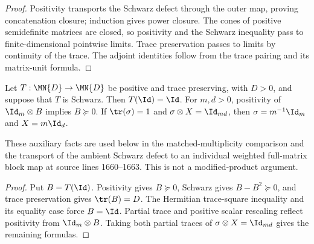 \begin{proof}
    \leanok
    Positivity transports the Schwarz defect through the outer map, proving
    concatenation closure; induction gives power closure. The cones of
    positive semidefinite matrices are closed, so positivity and the Schwarz
    inequality pass to finite-dimensional pointwise limits. Trace
    preservation passes to limits by continuity of the trace. The adjoint
    identities follow from the trace pairing and its matrix-unit formula.
\end{proof}

\begin{theorem}
    \label{thm:wolf_cycle_schwarz_unital_kronecker}
    \leanok
    Let $T:\MN{D}\to\MN{D}$ be positive and trace preserving, with $D>0$,
    and suppose that $T$ is Schwarz. Then $T(\Id)=\Id$. For $m,d>0$,
    positivity of $\Id_m\otimes B$ implies $B\succeq0$. If
    $\tr(\sigma)=1$ and $\sigma\otimes X=\Id_{md}$, then
    $\sigma=m^{-1}\Id_m$ and $X=m\Id_d$.

    These auxiliary facts are used below in the matched-multiplicity comparison
    and the transport of the ambient Schwarz defect to an individual weighted
    full-matrix block map at source lines 1660--1663. This is not a
    modified-product argument.
\end{theorem}

\begin{proof}
    \leanok
    Put $B=T(\Id)$. Positivity gives $B\succeq0$, Schwarz gives
    $B-B^2\succeq0$, and trace preservation gives $\tr(B)=D$. The Hermitian
    trace-square inequality and its equality case force $B=\Id$. Partial
    trace and positive scalar rescaling reflect positivity from
    $\Id_m\otimes B$. Taking both partial traces of
    $\sigma\otimes X=\Id_{md}$ gives the remaining formulas.
\end{proof}

